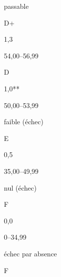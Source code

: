 \documentclass [12 pt]{article}
\begin{document}
                            
                                passable
                            
                            
                                D+
                            
                            
                                1,3
                            
                            
                                54,00–56,99
                            
                        
                        
                            
                                D
                            
                            
                                 1,0**
                            
                            
                                50,00–53,99
                            
                        
                        
                            
                                faible (échec)
                            
                            
                                E
                            
                            
                                0,5
                            
                            
                                35,00–49,99
                            
                        
                        
                            
                                nul (échec)
                            
                            
                                F
                            
                            
                                0,0
                            
                            
                                0–34,99
                            
                        
                        
                            
                                échec par absence
                            
                            
                                F
                            
\end{document}
